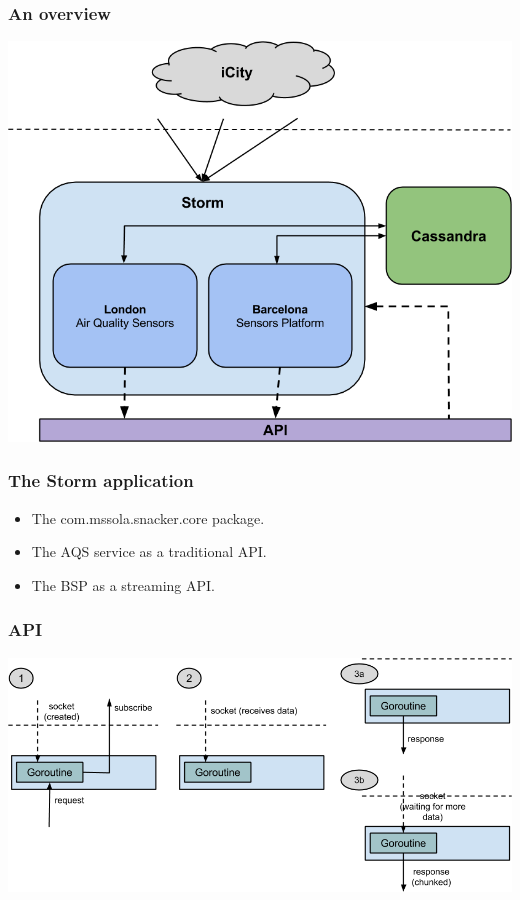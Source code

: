 \documentclass[12pt]{beamer}
\begin{document}
\begin{frame}
\vfill
  \frametitle{An overview}
  \begin{center}
    \includegraphics[scale=0.4]{images/arch.png}
  \end{center}
\vfill
\end{frame}

\begin{frame}
\vfill
  \frametitle{The Storm application}
  \begin{itemize}
    \item The com.mssola.snacker.core package.
    \vfill
    \item The AQS service as a traditional API.
    \vfill
    \item The BSP as a streaming API.
    \vfill
  \end{itemize}
\vfill
\end{frame}

\begin{frame}
\vfill
  \frametitle{API}
  \begin{center}
    \includegraphics[scale=0.45]{images/api.png}
  \end{center}
\vfill
\end{frame}
\end{document}
